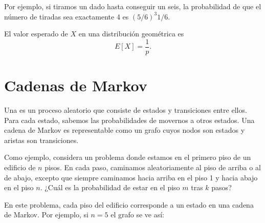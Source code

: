Por ejemplo, si tiramos un dado hasta conseguir un seis, la probabilidad
de que el número de tiradas sea exactamente 4 es $(5/6)^3 1/6$.

El valor esperado de $X$ en una distribución geométrica es
\[E[X]=\frac{1}{p}.\]

\section{Cadenas de Markov}


Una  es un proceso aleatorio que consiste de
estados y transiciones entre ellos. Para cada estado, sabemos las
probabilidades de movernos a otros estados. Una cadena de Markov es
representable como un grafo cuyos nodos son estados y aristas
son transiciones.

Como ejemplo, considera un problema donde estamos en el primero piso
de un edificio de $n$ pisos. En cada paso, caminamos aleatoriamente
al piso de arriba o al de abajo, excepto que siempre caminamos hacia
arriba en el piso 1 y hacia abajo en el piso $n$. ¿Cuál es la
probabilidad de estar en el piso $m$ tras $k$ pasos?

\pagebreak
En este problema, cada piso del edificio corresponde a un estado en una
cadena de Markov. Por ejemplo, si $n=5$ el grafo se ve así:

\begin{center}
\end{center}

